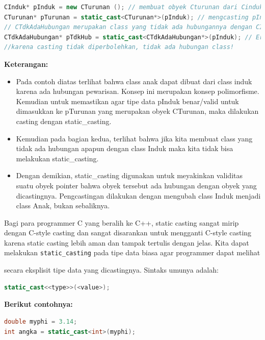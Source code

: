 \begin{lstlisting}[language=c++, numbers=none]
CInduk* pInduk = new CTurunan (); // membuat obyek Cturunan dari Cinduk (polymorfisme)
CTurunan* pTurunan = static_cast<CTurunan*>(pInduk); // mengcasting pInduk menjadi Cturunan, valid!
// CTdkAdaHubungan merupakan class yang tidak ada hubungannya dengan CInduk melalui inheritance
CTdkAdaHubungan* pTdkHub = static_cast<CTdkAdaHubungan*>(pInduk); // Error
//karena casting tidak diperbolehkan, tidak ada hubungan class!
\end{lstlisting}

\textbf{Keterangan:}

\begin{itemize}

\item
Pada contoh diatas terlihat bahwa class anak dapat dibuat dari class
induk karena ada hubungan pewarisan. Konsep ini merupakan konsep
polimorfisme. Kemudian untuk memastikan agar tipe data pInduk
benar/valid untuk dimasukkan ke pTurunan yang merupakan obyek
CTurunan, maka dilakukan casting dengan static\_casting.
\item
Kemudian pada bagian kedua, terlihat bahwa jika kita membuat class
yang tidak ada hubungan apapun dengan class Induk maka kita tidak bisa
melakukan static\_casting.
\item
Dengan demikian, static\_casting digunakan untuk meyakinkan validitas
suatu obyek pointer bahwa obyek tersebut ada hubungan dengan obyek
yang dicastingnya. Pengcastingan dilakukan dengan mengubah class Induk
menjadi class Anak, bukan sebaliknya.
\end{itemize}

Bagi para programmer C yang beralih ke C++, static casting sangat mirip
dengan C-style casting dan sangat disarankan untuk mengganti C-style
casting karena static casting lebih aman dan tampak tertulis dengan
jelas. Kita dapat melakukan \texttt{static\_casting} pada tipe data
biasa agar programmer dapat melihat

secara eksplisit tipe data yang dicastingnya. Sintaks umunya adalah:

\begin{lstlisting}[language=c++, numbers=none]
static_cast<<type>>(<value>);
\end{lstlisting}

\textbf{Berikut contohnya:}

\begin{lstlisting}[language=c++, numbers=none]
double myphi = 3.14;
int angka = static_cast<int>(myphi);
\end{lstlisting}

